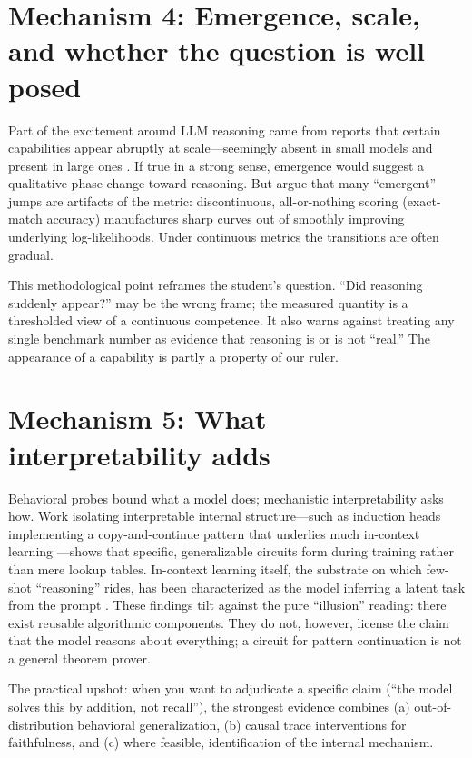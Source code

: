 \documentclass[11pt]{article}
\begin{document}
\section{Mechanism 4: Emergence, scale, and whether the question is well posed}
Part of the excitement around LLM reasoning came from reports that certain capabilities appear abruptly at scale---seemingly absent in small models and present in large ones \citep{wei2022emergent}. If true in a strong sense, emergence would suggest a qualitative phase change toward reasoning. But \citet{schaeffer2023emergent} argue that many ``emergent'' jumps are artifacts of the metric: discontinuous, all-or-nothing scoring (exact-match accuracy) manufactures sharp curves out of smoothly improving underlying log-likelihoods. Under continuous metrics the transitions are often gradual.

This methodological point reframes the student's question. ``Did reasoning suddenly appear?'' may be the wrong frame; the measured quantity is a thresholded view of a continuous competence. It also warns against treating any single benchmark number as evidence that reasoning is or is not ``real.'' The appearance of a capability is partly a property of our ruler.

\section{Mechanism 5: What interpretability adds}
Behavioral probes bound what a model does; mechanistic interpretability asks how. Work isolating interpretable internal structure---such as induction heads implementing a copy-and-continue pattern that underlies much in-context learning \citep{olsson2022incontext}---shows that specific, generalizable circuits form during training rather than mere lookup tables. In-context learning itself, the substrate on which few-shot ``reasoning'' rides, has been characterized as the model inferring a latent task from the prompt \citep{xie2022explanation}. These findings tilt against the pure ``illusion'' reading: there exist reusable algorithmic components. They do not, however, license the claim that the model reasons about everything; a circuit for pattern continuation is not a general theorem prover.

The practical upshot: when you want to adjudicate a specific claim (``the model solves this by addition, not recall''), the strongest evidence combines (a) out-of-distribution behavioral generalization, (b) causal trace interventions for faithfulness, and (c) where feasible, identification of the internal mechanism.
\end{document}
